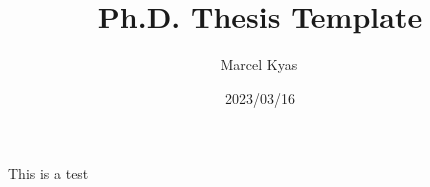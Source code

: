 \documentclass[a4paper,12pt]{ruthesis2}
\begin{document}
\title{Ph.D. Thesis Template}
\author{Marcel Kyas\,}
\date{2023/03/16}

\maketitle

\begin{center}
\end{center}

This is a test
\end{document}
